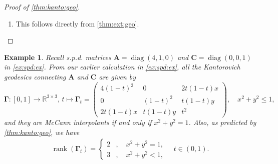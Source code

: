 \documentclass[noinfoline]{imsart}\setcounter{tocdepth}{2}
\renewcommand{\b}[1]{\mathbb{#1}} %
\newcommand{\m}[1]{\mathbf{#1}} %
\renewcommand{\c}[1]{\mathcal{#1}} %
\DeclareMathOperator*{\diag}{diag}
\DeclareMathOperator*{\rk}{rank}
\theoremstyle{plain}
\newtheorem{example}{Example}[section]
\begin{document}
\begin{proof}[Proof of \cref{thm:kanto:geo}]
\begin{enumerate}[leftmargin = *]
It remains to show that $\tilde{\m{\Gamma}}_{t} = \m{\Gamma}_{t}^{\m{N}_{12}}$ for all $t \in (0, 1)$. Note that $\m{M} \in \c{G}(\m{B}) $ associated with $\m{N}_{12}$ satisfies $\m{G}^{*} \m{M} \succeq \m{0}$. Then, we obtain from \cref{cor:bary:injec} that the reverse Schur complement vanishes: $\m{A}/\m{\Gamma}_{t}^{\m{N}_{12}} = \m{0}$. Due to \cref{thm:spd:revise} and part 1,  $\m{\Gamma}^{\m{N}_{12}}: [t, 0] \to \b{R}^{n \times n}$ (reversed time) is the unique constant-speed geodesic connecting $\m{\Gamma}_{t}^{\m{N}_{12}}$ and $\m{A}$. Repeating the proof, we get that $\m{\Gamma}^{\m{N}_{12}}: [t, 1] \to \b{R}^{n \times n}$ is the unique constant-speed geodesic connecting $\m{\Gamma}_{t}^{\m{N}_{12}}$ and $\m{B}$. 
\item This follows directly from \cref{thm:ext:geo}.
\end{enumerate}
\end{proof}

\begin{example}
Recall s.p.d. matrices $\m{A} = \diag(4, 1, 0)$ and $\m{C} = \diag(0, 0 , 1)$ in \cref{ex:spd:ex}. From our earlier calculation  in \cref{ex:spd:ex}, all the Kantorovich geodesics connecting $\m{A}$ and $\m{C}$ are given by
\begin{equation*}
    \m{\Gamma}: [0, 1] \to \b{R}^{3 \times 3}, \, t \mapsto \m{\Gamma}_{t} = \begin{pmatrix}
    4(1-t)^{2} & 0 & 2t (1-t) x  \\
    0 & (1-t)^{2} & t (1-t) y \\
    2t (1-t) x & t (1-t) y & t^{2}
    \end{pmatrix}, \quad x^{2} + y^{2} \le 1,
\end{equation*}
and they are McCann interpolants if and only if $x^{2} + y^{2} = 1$. Also, as predicted by \cref{thm:kanto:geo}, we have
\begin{align*}
    \rk(\m{\Gamma}_{t}) = \begin{cases}
        2 &, \quad x^{2} + y^{2} = 1, \\
        3 &, \quad x^{2} + y^{2} < 1,
    \end{cases} \quad t \in (0, 1).
\end{align*}
\end{example}
\end{document}
